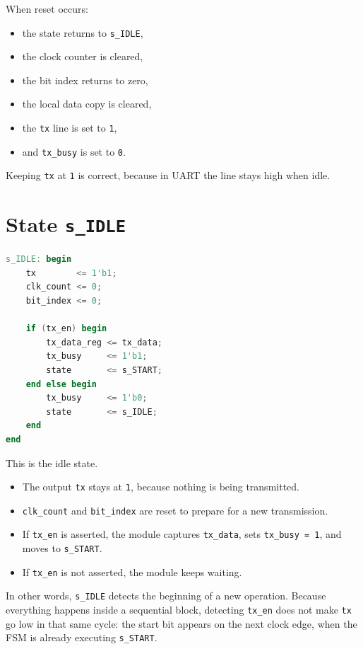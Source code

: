 \documentclass[12pt]{article}
\begin{document}
When reset occurs:

\begin{itemize}
    \item the state returns to \texttt{s\_IDLE},
    \item the clock counter is cleared,
    \item the bit index returns to zero,
    \item the local data copy is cleared,
    \item the \texttt{tx} line is set to \texttt{1},
    \item and \texttt{tx\_busy} is set to \texttt{0}.
\end{itemize}

Keeping \texttt{tx} at \texttt{1} is correct, because in UART the line stays high when idle.

\section{State \texttt{s\_IDLE}}

\begin{lstlisting}[language=Verilog]
s_IDLE: begin
    tx        <= 1'b1;
    clk_count <= 0;
    bit_index <= 0;
    
    if (tx_en) begin
        tx_data_reg <= tx_data;
        tx_busy     <= 1'b1;
        state       <= s_START;
    end else begin
        tx_busy     <= 1'b0;
        state       <= s_IDLE;
    end
end
\end{lstlisting}

This is the idle state.

\begin{itemize}
    \item The output \texttt{tx} stays at \texttt{1}, because nothing is being transmitted.
    \item \texttt{clk\_count} and \texttt{bit\_index} are reset to prepare for a new transmission.
    \item If \texttt{tx\_en} is asserted, the module captures \texttt{tx\_data}, sets \texttt{tx\_busy = 1}, and moves to \texttt{s\_START}.
    \item If \texttt{tx\_en} is not asserted, the module keeps waiting.
\end{itemize}

In other words, \texttt{s\_IDLE} detects the beginning of a new operation. Because everything happens inside a sequential block, detecting \texttt{tx\_en} does not make \texttt{tx} go low in that same cycle: the start bit appears on the next clock edge, when the FSM is already executing \texttt{s\_START}.
\end{document}
